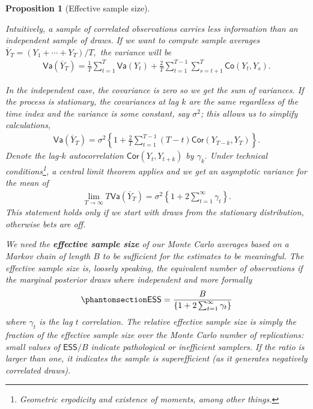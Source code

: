 \documentclass[
  11pt,
  letterpaper,
]{scrbook}
\theoremstyle{definition}
\theoremstyle{plain}
\theoremstyle{plain}
\newtheorem{proposition}{Proposition}[chapter]
\theoremstyle{definition}
\theoremstyle{definition}
\theoremstyle{remark}
\begin{document}
\begin{proposition}[Effective sample
size]\protect\hypertarget{prp-variance-clt}{}\label{prp-variance-clt}

Intuitively, a sample of correlated observations carries less
information than an independent sample of draws. If we want to compute
sample averages \(\overline{Y}_T=(Y_1+ \cdots + Y_T)/T,\) the variance
will be \begin{align*}
\mathsf{Va}\left(\overline{Y}_T\right) = \frac{1}{T}\sum_{t=1}^T \mathsf{Va}(Y_t) + \frac{2}{T} \sum_{t=1}^{T-1}\sum_{s = t+1}^T \mathsf{Co}(Y_t, Y_s).
\end{align*}

In the independent case, the covariance is zero so we get the sum of
variances. If the process is stationary, the covariances at lag \(k\)
are the same regardless of the time index and the variance is some
constant, say \(\sigma^2\); this allows us to simplify calculations,
\begin{align*}
\mathsf{Va}(\overline{Y}_T) = \sigma^2 \left\{ 1 + \frac{2}{T}\sum_{t=1}^{T-1} (T-t) \mathsf{Cor}(Y_{T-k}, Y_{T})\right\}.
\end{align*} Denote the lag-\(k\) autocorrelation
\(\mathsf{Cor}(Y_{t}, Y_{t+k})\) by \(\gamma_k.\) Under technical
conditions\footnote{Geometric ergodicity and existence of moments, among
  other things.}, a central limit theorem applies and we get an
asymptotic variance for the mean of \begin{align*}
\lim_{T \to \infty} T\mathsf{Va}\left(\overline{Y}_T\right) = \sigma^2 \left\{1+2\sum_{t=1}^\infty \gamma_t\right\}.
\end{align*} This statement holds only if we start with draws from the
stationary distribution, otherwise bets are off.

We need the \textbf{effective sample size} of our Monte Carlo averages
based on a Markov chain of length \(B\) to be sufficient for the
estimates to be meaningful. The effective sample size is, loosely
speaking, the equivalent number of observations if the marginal
posterior draws where independent and more formally
\begin{equation}\phantomsection\label{eq-effective-sample-size}{
\mathsf{ESS} = \frac{B}{\left\{1+2\sum_{t=1}^\infty \gamma_t\right\}}
}\end{equation} where \(\gamma_t\) is the lag \(t\) correlation. The
relative effective sample size is simply the fraction of the effective
sample size over the Monte Carlo number of replications: small values of
\(\mathsf{ESS}/B\) indicate pathological or inefficient samplers. If the
ratio is larger than one, it indicates the sample is superefficient (as
it generates negatively correlated draws).


\end{proposition}
\end{document}
